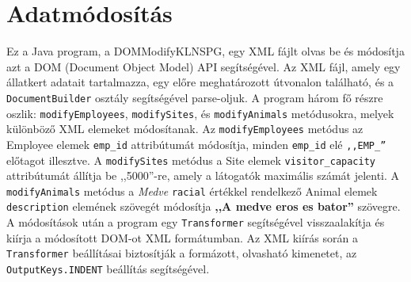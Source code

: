 \documentclass[12pt]{report}
\begin{document}
\section{Adatmódosítás}
\indent\indent Ez a Java program, a DOMModifyKLNSPG, egy XML fájlt olvas be és módosítja azt a DOM (Document Object Model) API segítségével. Az XML fájl, amely egy állatkert adatait tartalmazza, egy előre meghatározott útvonalon található, és a \texttt{DocumentBuilder} osztály segítségével parse-oljuk. A program három fő részre oszlik: \texttt{modifyEmployees}, \texttt{modifySites}, és \texttt{modifyAnimals} metódusokra, melyek különböző XML elemeket módosítanak. Az \texttt{modifyEmployees} metódus az Employee elemek \texttt{emp\_id} attribútumát módosítja, minden \texttt{emp\_id} elé \texttt{,,EMP\_''} előtagot illesztve. A \texttt{modifySites} metódus a Site elemek \texttt{visitor\_capacity} attribútumát állítja be ,,5000''-re, amely a látogatók maximális számát jelenti. A \texttt{modifyAnimals} metódus a \textit{Medve} \texttt{racial} értékkel rendelkező Animal elemek \texttt{description} elemének szövegét módosítja \textbf{,,A medve eros es bator''} szövegre. A módosítások után a program egy \texttt{Transformer} segítségével visszaalakítja és kiírja a módosított DOM-ot XML formátumban. Az XML kiírás során a \texttt{Transformer} beállításai biztosítják a formázott, olvasható kimenetet, az \texttt{OutputKeys.INDENT} beállítás segítségével.\\
\end{document}
